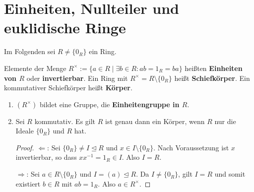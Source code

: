 \section{Einheiten, Nullteiler und euklidische Ringe}
Im Folgenden sei $R \neq \{0_R\}$ ein Ring.
\begin{definition}
	Elemente der Menge $R^\times := \{a \in R \mid \exists b \in R : ab = 1_R = ba\}$ heißten \textbf{Einheiten von $R$} oder \textbf{invertierbar}. Ein Ring mit $R^\times = R \setminus \{0_R\}$ heißt \textbf{Schiefkörper}. Ein kommutativer Schiefkörper heißt \textbf{Körper}.
\end{definition}
\begin{rem}\label{rem5_2}
	\begin{enumerate}[label=(\roman*)]
		\item $(R^\times)$ bildet eine Gruppe, die \textbf{Einheitengruppe in $R$}.
		\item Sei $R$ kommutativ. Es gilt $R$ ist genau dann ein Körper, wenn $R$ nur die Ideale $\{0_R\}$ und $R$ hat.
		\begin{proof}
			\glqq{}$\Leftarrow$\grqq: Sei $\{0_R\} \neq I \unlhd R$ und $x \in I \setminus \{0_R\}$. Nach Voraussetzung ist $x$ invertierbar, so dass $xx^{-1} = 1_R \in I$. Also $I=R$.
			
			\glqq{}$\Rightarrow$\grqq: Sei $a \in R \setminus \{0_R\}$ und $I = (a) \unlhd R$. Da $I \neq \{0_R\}$, gilt $I=R$ und somit existiert $b \in R$ mit $ab = 1_R$. Also $a \in R^\times$.
		\end{proof}
	\end{enumerate}
\end{rem}
